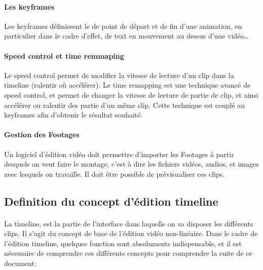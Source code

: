 \paragraph{Les keyframes}
Les keyframes définissent le de point de départ et de fin d'une animation,
en particulier dans le cadre d'effet, de text en mouvement au dessus
d'une vidéo\ldots

\paragraph{Speed control et time remmaping}
Le speed control permet de modifier la vitesse de lecture d'un clip dans la
timeline (ralentir où accélérer). Le time remapping est une technique avancé
de speed control, et permet de changer la vitesse de lecture de partie de clip,
et ainsi accélérer ou ralentir des partie d'un même clip. Cette technique est
couplé au keyframes afin d'obtenir le résultat souhaité.

\paragraph{Gestion des Footages}
Un logiciel d'édition vidéo doit permettre d'importer les Footages  à partir
desquels on veut faire le montage, c'est à dire les fichiers vidéos, audios,
et images avec lesquels on travaille. Il doit être possible de prévisualiser ces
clips.

\subsection{Definition du concept d'édition timeline}
\paragraph{}
La timeline, est la partie de l'interface dans laquelle on va disposer les
différents clips. Il s'agit du concept de base de l'édition vidéo non-linéaire.
Dans le cadre de l'édition timeline, quelques fonction sont absoluments
indispensable, et il est nécessaire de comprendre ces différents concepts
pour comprendre la suite de ce document:

